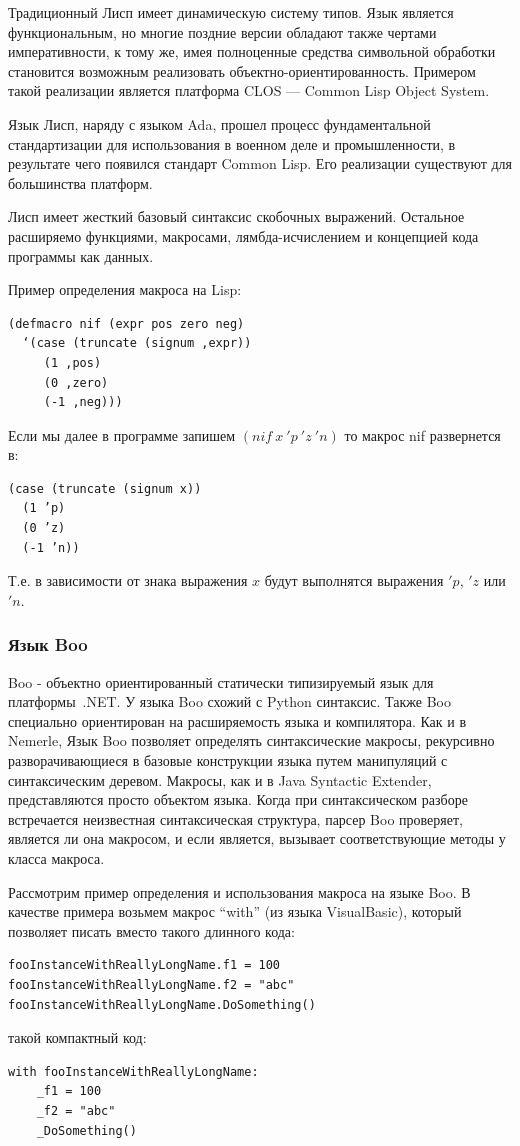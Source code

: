\documentclass[a4paper,12pt]{article}
\begin{document}
Традиционный Лисп имеет динамическую систему типов. Язык является
функциональным, но многие поздние версии обладают также чертами императивности,
к тому же, имея полноценные средства символьной обработки становится возможным
реализовать объектно-ориентированность. Примером такой реализации является
платформа CLOS --- Common Lisp Object System.

Язык Лисп, наряду с языком Ada, прошел процесс фундаментальной стандартизации
для использования в военном деле и промышленности, в результате чего появился
стандарт Common Lisp. Его реализации существуют для большинства платформ.

Лисп имеет жесткий базовый синтаксис скобочных выражений. Остальное расширяемо
функциями, макросами, лямбда-исчислением и концепцией кода программы как
данных.

\begin{example}
Пример определения макроса на Lisp:
\end{example}
\begin{verbatim}
(defmacro nif (expr pos zero neg)
  ‘(case (truncate (signum ,expr))
     (1 ,pos)
     (0 ,zero)
     (-1 ,neg)))
\end{verbatim}
Если мы далее в программе запишем $(nif ~ x ~ 'p ~ 'z ~ 'n)$ то макрос nif
развернется в:
\begin{verbatim}
(case (truncate (signum x))
  (1 ’p)
  (0 ’z)
  (-1 ’n))
\end{verbatim}
Т.е. в зависимости от знака выражения $x$ будут выполнятся выражения $'p$, $'z$
или $'n$.

\subsubsection*{Язык Boo}
Boo - объектно ориентированный статически типизируемый язык для платформы~.NET.
У языка Boo схожий с Python синтаксис. Также Boo специально ориентирован на
расширяемость языка и компилятора. Как и в Nemerle, Язык Boo позволяет
определять синтаксические макросы, рекурсивно разворачивающиеся в базовые
конструкции языка путем манипуляций с синтаксическим деревом. Макросы, как и в
Java Syntactic Extender, представляются просто объектом языка. Когда при
синтаксическом разборе встречается неизвестная синтаксическая структура, парсер
Boo проверяет, является ли она макросом, и если является, вызывает
соответствующие методы у класса макроса.

Рассмотрим пример определения и использования макроса на языке Boo. В качестве
примера возьмем макрос ``with'' (из языка VisualBasic), который позволяет писать
вместо такого длинного кода:
\begin{verbatim}
fooInstanceWithReallyLongName.f1 = 100
fooInstanceWithReallyLongName.f2 = "abc"
fooInstanceWithReallyLongName.DoSomething()
\end{verbatim}
такой компактный код:
\begin{verbatim}
with fooInstanceWithReallyLongName:
    _f1 = 100
    _f2 = "abc"
    _DoSomething()
\end{verbatim}
\end{document}
